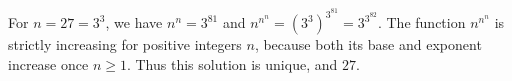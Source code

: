 For $n=27=3^3$, we have $n^n=3^{81}$ and $n^{n^n}=(3^3)^{3^{81}}=3^{3^{82}}$. The function $n^{n^n}$ is strictly increasing for positive integers $n$, because both its base and exponent increase once $n\ge1$. Thus this solution is unique, and $\boxed{27}$.
